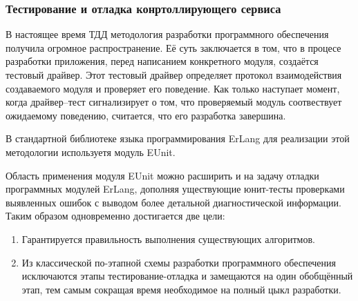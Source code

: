 \subsubsection{Тестирование и отладка конртоллирующего сервиса}
В настоящее время ТДД методология разработки программного обеспечения получила огромное распространение.
Её суть заключается в том, что в процесе разработки приложения, перед написанием
конкретного модуля, создаётся тестовый драйвер. Этот тестовый драйвер определяет протокол
взаимодействия создаваемого модуля и проверяет его поведение. Как только наступает момент, когда
драйвер--тест сигнализирует о том, что проверяемый модуль соотвествует ожидаемому поведению,
считается, что его разработка завершина.

В стандартной библиотеке языка программирования ErLang для реализации этой методологии используетя модуль EUnit.


Область применения модуля EUnit можно расширить и на задачу отладки программных модулей ErLang,
дополняя уществующие юнит-тесты проверками выявленных ошибок с выводом более детальной диагностической информации.
Таким образом одновременно достигается две цели:
\begin{enumerate}
	\item{} Гарантируется правильность выполнения существующих алгоритмов.
	\item{} Из классической по-этапной схемы разработки программного
		обеспечения исключаются этапы тестирование-отладка и замещаются на один обобщённый этап,
		тем самым сокращая время необходимое на полный цыкл разработки.
\end{enumerate}


